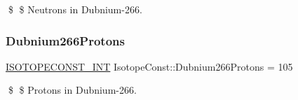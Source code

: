 \$ \$ Neutrons in Dubnium-\/266. \mbox{\label{group___isotope_const-_dubnium-_db266_gaa2e616be1cd7cd977dc402aa7560d8c6}} 
\subsubsection{\texorpdfstring{Dubnium266\+Protons}{Dubnium266Protons}}
{\footnotesize\ttfamily \mbox{\hyperlink{group___isotope_const-_macros_ga5f18360b3e99483a35c32d789e62621c}{I\+S\+O\+T\+O\+P\+E\+C\+O\+N\+S\+T\+\_\+\+I\+NT}} Isotope\+Const\+::\+Dubnium266\+Protons = 105}

\$ \$ Protons in Dubnium-\/266. 